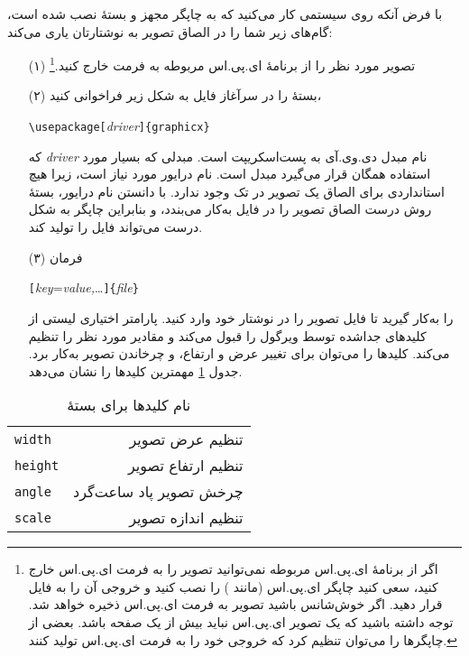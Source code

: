 با فرض آنکه روی سیستمی کار می‌کنید که به چاپگر
\PSi مجهز و بستهٔ \textsf{} 
نصب شده است، گام‌های زیر شما را در الصاق   تصویر به  نوشتارتان یاری می‌کند:
\begin{itemize}
\item[(۱)]
 تصویر مورد نظر را از برنامهٔ ای.پی.اس مربوطه به فرمت  خارج کنید.\footnote{اگر از برنامهٔ ای.پی.اس مربوطه نمی‌توانید تصویر را به فرمت ای.پی.اس خارج کنید، سعی کنید چاپگر ای.پی.اس (مانند 
) را نصب کنید و خروجی آن را به فایل قرار دهید. اگر خوش‌شانس باشید تصویر به فرمت ای.پی.اس ذخیره خواهد شد. توجه داشته باشید که یک تصویر ای.پی.اس نباید بیش از یک صفحه باشد. بعضی از چاپگرها را می‌توان تنظیم کرد که خروجی خود را به فرمت ای.پی.اس تولید کنند.}
\item[(۲)]
 بستهٔ \textsf{} را در سرآغاز فایل به شکل زیر فراخوانی کنید،
\begin{lscommand}
\verb|\usepackage[|\emph{driver}\verb|]{graphicx}|
\end{lscommand}
\noindent
  که \emph{driver} نام مبدل دی.وی.آی به پست‌اسکریپت است. مبدلی که بسیار مورد استفاده همگان قرار می‌گیرد مبدل \texttt{} است. نام درایور مورد نیاز است، زیرا هیچ استانداردی برای الصاق یک تصویر در تک وجود ندارد. با دانستن نام درایور، بستهٔ \textsf{}  روش درست الصاق تصویر را در فایل   به‌کار می‌بندد، و بنابراین چاپگر به شکل درست می‌تواند فایل   را تولید کند.
\item[(۳)]
 فرمان
\begin{lscommand}
\verb|[|\emph{key}=\emph{value,}\ldots\verb|]{|\emph{file}\verb|}|
\end{lscommand}
\noindent را به‌کار گیرید تا فایل تصویر را در نوشتار‌ خود وارد کنید. پارامتر اختیاری لیستی از کلیدهای جداشده توسط ویرگول را قبول می‌کند و مقادیر مورد نظر را تنظیم می‌کند. کلید‌ها را می‌توان برای تغییر عرض و ارتفاع، و چرخاندن  تصویر به‌کار برد. جدول 
\ref{keyvals}
مهمترین کلیدها را نشان می‌دهد.
\end{itemize}

\begin{table}[htb]
\caption{نام کلیدها برای بستهٔ  }
\label{keyvals}
\begin{lined}{9cm}
\begin{tabular}{@{}lr}
\texttt{width}& تنظیم عرض تصویر\\
\texttt{height}&تنظیم ارتفاع تصویر\\
\texttt{angle}&چرخش تصویر  پاد ساعت‌گرد\\
\texttt{scale}&تنظیم اندازه تصویر\\
\end{tabular}

\bigskip
\end{lined}
\end{table}


